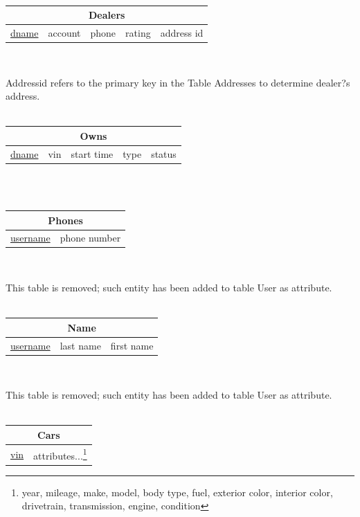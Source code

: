 \documentclass[12pt]{article}
\begin{document}
~\\
\begin{tabularx}{\textwidth}{|X|X|X|X|X|}
\hline
\multicolumn{5}{|c|}{Dealers}\\\hline
\underline{dname} & account & phone & rating & \cellcolor{green!25}address id\\\hline
\end{tabularx}
~\\
\par Addressid refers to the primary key in the Table Addresses to determine dealer?s address.\\
~\\
\begin{tabularx}{\textwidth}{|X|X|X|X|X|}
\hline
\multicolumn{5}{|c|}{Owns}\\\hline
\underline{dname} & vin & start time & type & status\\\hline
\end{tabularx}
~\\~\\
\begin{tabularx}{\textwidth}{|X|X|}
\hline
\multicolumn{2}{|c|}{\cellcolor{red!25}Phones}\\\hline
\cellcolor{red!25}\underline{username} & \cellcolor{red!25}phone number\\\hline
\end{tabularx}
~\\
\par This table is removed; such entity has been added to table User as attribute.\\
~\\
\begin{tabularx}{\textwidth}{|X|X|X|}
\hline
\multicolumn{3}{|c|}{\cellcolor{red!25}Name}\\\hline
\cellcolor{red!25}\underline{username} & \cellcolor{red!25}last name & \cellcolor{red!25}first name\\\hline
\end{tabularx}
~\\
\par This table is removed; such entity has been added to table User as attribute.\\
~\\
\begin{tabularx}{\textwidth}{|X|X|}
\hline
\multicolumn{2}{|c|}{Cars}\\\hline
\underline{vin} & attributes...\footnote{year, mileage, make, model, body type, fuel, exterior color, interior color, drivetrain, transmission, engine, condition}\\\hline
\end{tabularx}
\end{document}
